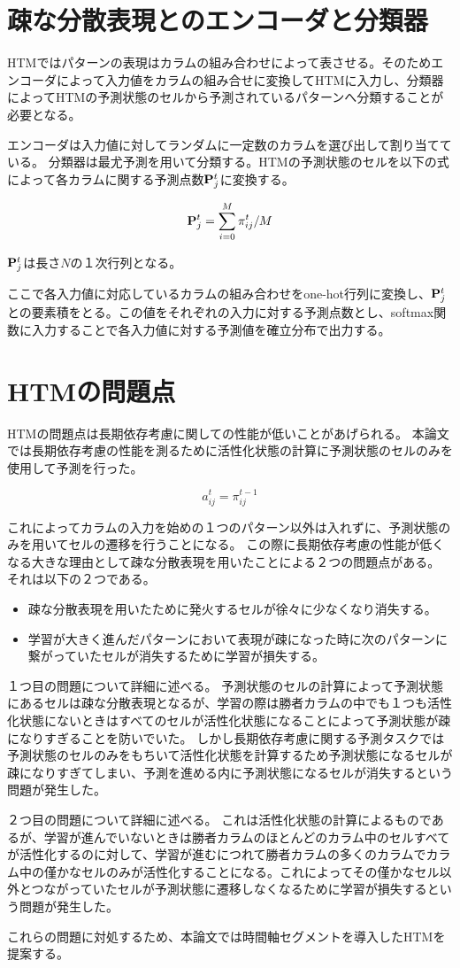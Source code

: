 \section{疎な分散表現とのエンコーダと分類器}
HTMではパターンの表現はカラムの組み合わせによって表させる。そのためエンコーダによって入力値をカラムの組み合せに変換してHTMに入力し、分類器によってHTMの予測状態のセルから予測されているパターンへ分類することが必要となる。

エンコーダは入力値に対してランダムに一定数のカラムを選び出して割り当てている。
分類器は最尤予測を用いて分類する。HTMの予測状態のセルを以下の式によって各カラムに関する予測点数${\bf P}^t_j$に変換する。

\begin{equation}
  {\bf P}^t_j = \sum^{M}_{i=0} \pi^t_{ij} / M
\end{equation}

${\bf P}^t_j$は長さ$N$の１次行列となる。

ここで各入力値に対応しているカラムの組み合わせをone-hot行列に変換し、${\bf P}^t_j$との要素積をとる。この値をそれぞれの入力に対する予測点数とし、softmax関数に入力することで各入力値に対する予測値を確立分布で出力する。

\section{HTMの問題点}
HTMの問題点は長期依存考慮に関しての性能が低いことがあげられる。
本論文では長期依存考慮の性能を測るために活性化状態の計算に予測状態のセルのみを使用して予測を行った。

\begin{equation}
  a^t_{ij} = \pi^{t-1}_{ij}
\end{equation}

これによってカラムの入力を始めの１つのパターン以外は入れずに、予測状態のみを用いてセルの遷移を行うことになる。
この際に長期依存考慮の性能が低くなる大きな理由として疎な分散表現を用いたことによる２つの問題点がある。
それは以下の２つである。

\begin{itemize}
  \item 疎な分散表現を用いたために発火するセルが徐々に少なくなり消失する。
  \item 学習が大きく進んだパターンにおいて表現が疎になった時に次のパターンに繋がっていたセルが消失するために学習が損失する。
\end{itemize}

１つ目の問題について詳細に述べる。
予測状態のセルの計算によって予測状態にあるセルは疎な分散表現となるが、学習の際は勝者カラムの中でも１つも活性化状態にないときはすべてのセルが活性化状態になることによって予測状態が疎になりすぎることを防いでいた。
しかし長期依存考慮に関する予測タスクでは予測状態のセルのみをもちいて活性化状態を計算するため予測状態になるセルが疎になりすぎてしまい、予測を進める内に予測状態になるセルが消失するという問題が発生した。

２つ目の問題について詳細に述べる。
これは活性化状態の計算によるものであるが、学習が進んでいないときは勝者カラムのほとんどのカラム中のセルすべてが活性化するのに対して、学習が進むにつれて勝者カラムの多くのカラムでカラム中の僅かなセルのみが活性化することになる。これによってその僅かなセル以外とつながっていたセルが予測状態に遷移しなくなるために学習が損失するという問題が発生した。

これらの問題に対処するため、本論文では時間軸セグメントを導入したHTMを提案する。
